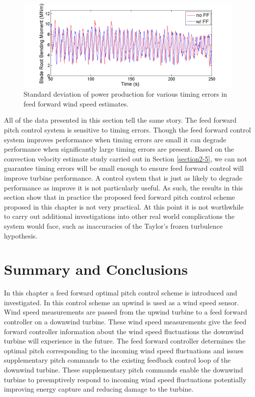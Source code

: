 \begin{figure}[htbp]
	\centering
		\includegraphics[width = \linewidth]{Figures/ch3Figures/fig3-35.png}
		
	\caption{Standard deviation of power production for various timing errors in feed forward wind speed estimates.}
	\label{fig3-38}
\end{figure}

All of the data presented in this section tell the same story. The feed forward pitch control system is sensitive to timing errors. Though the feed forward control system improves performance when timing errors are small it can degrade performance when significantly large timing errors are present. Based on the convection velocity estimate study carried out in Section \ref{section2-5}, we can not guarantee timing errors will be small enough to ensure feed forward control will improve turbine performance. A control system that is just as likely to degrade performance as improve it is not particularly useful. As such, the results in this section show that in practice the proposed feed forward pitch control scheme proposed in this chapter is not very practical. At this point it is not worthwhile to carry out additional investigations into other real world complications the system would face, such as inaccuracies of the Taylor's frozen turbulence hypothesis.

\section{Summary and Conclusions}

In this chapter a feed forward optimal pitch control scheme is introduced and investigated. In this control scheme an upwind is used as a wind speed sensor. Wind speed measurements are passed from the upwind turbine to a feed forward controller on a downwind turbine. These wind speed measurements give the feed forward controller information about the wind speed fluctuations the downwind turbine will experience in the future. The feed forward controller determines the optimal pitch corresponding to the incoming wind speed fluctuations and issues supplementary pitch commands to the existing feedback control loop of the downwind turbine. These supplementary pitch commands enable the downwind turbine to preemptively respond to incoming wind speed fluctuations potentially improving energy capture and reducing damage to the turbine.

